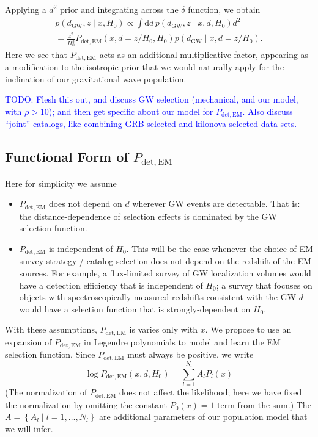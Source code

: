 \documentclass[modern]{aastex631}
\newcommand{\todo}[1]{\textcolor{blue}{TODO: #1}}
\newcommand{\dd}{\mathrm{d}}
\newcommand{\detected}{\mathrm{det}}
\newcommand{\EM}{\mathrm{EM}}
\newcommand{\GW}{\mathrm{GW}}
\begin{document}
Applying a $d^2$ prior and integrating across the $\delta$ function, we obtain 
\begin{multline}
    p\left( d_\GW, z \mid x, H_0 \right) \propto \int \dd d \, p\left( d_\GW, z \mid x, d, H_0 \right) d^2 \\ = \frac{z^2}{H_0^3} P_{\detected,\EM}\left( x, d = z/H_0, H_0 \right) p\left( d_\GW \mid x, d=z/H_0 \right).
\end{multline}
Here we see that $P_{\detected,\EM}$ acts as an additional multiplicative
factor, appearing as a modification to the isotropic prior that we would
naturally apply for the inclination of our gravitational wave population.

\todo{Flesh this out, and discuss GW selection (mechanical, and our model, with
$\rho > 10$); and then get specific about our model for $P_{\detected,\EM}$.
Also discuss ``joint'' catalogs, like combining GRB-selected and
kilonova-selected data sets.}

\subsection{Functional Form of $P_{\detected,\EM}$}

Here for simplicity we assume 
\begin{itemize}
    \item $P_{\detected,\EM}$ does not depend on $d$ wherever GW events are
    detectable.  That is: the distance-dependence of selection effects is
    dominated by the GW selection-function.
    \item $P_{\detected,\EM}$ is independent of $H_0$.  This will be the case
    whenever the choice of EM survey strategy / catalog selection does not
    depend on the redshift of the EM sources.  For example, a flux-limited
    survey of GW localization volumes would have a detection efficiency that is
    independent of $H_0$; a survey that focuses on objects with
    spectroscopically-measured redshifts consistent with the GW $d$ would have a
    selection function that is strongly-dependent on $H_0$.
\end{itemize}
With these assumptions, $P_{\detected,\EM}$ is varies only with $x$.  We propose
to use an expansion of $P_{\detected,\EM}$ in Legendre polynomials to model and
learn the EM selection function.  Since $P_{\detected,\EM}$ must always be
positive, we write
\begin{equation}
    \label{eq:Pdet-model}
    \log P_{\detected,\EM}\left( x, d, H_0 \right) = \sum_{l=1}^{N_l} A_l P_l(x)
\end{equation}
(The normalization of $P_{\detected,\EM}$ does not affect the likelihood; here
we have fixed the normalization by omitting the constant $P_0(x) = 1$ term from
the sum.)  The $A = \left\{ A_l \mid l = 1, \ldots, N_l \right\}$ are additional
parameters of our population model that we will infer.
\end{document}
